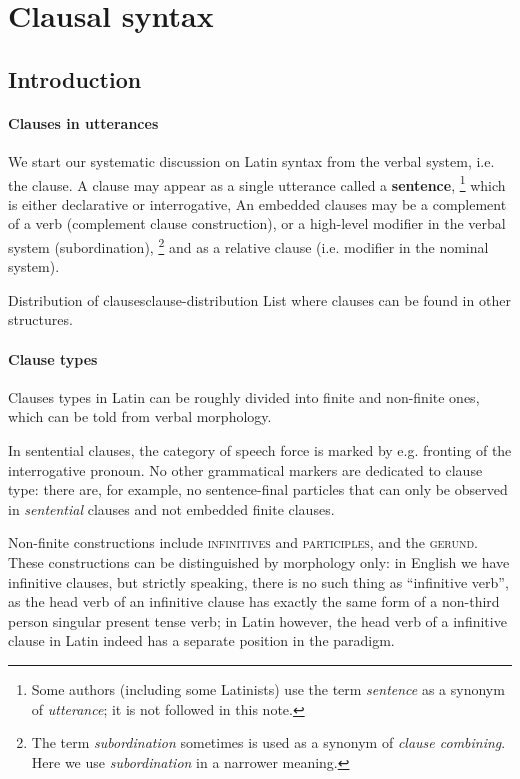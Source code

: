 \documentclass[a4paper, oneside, 12pt]{report}
\newcommand*{\concept}[1]{\textbf{#1}}
\newcommand*{\term}[1]{\emph{#1}}
\newcommand*{\category}[1]{\textsc{#1}}
\begin{document}
\section{Clausal syntax}\label{sec:grammatical.clause}

\subsection{Introduction}

\paragraph*{Clauses in utterances}
We start our systematic discussion on Latin syntax from the verbal system, i.e. the clause. 
A clause may appear as a single utterance called a \concept{sentence},%
\footnote{
    Some authors (including some Latinists) use the term \term{sentence}
    as a synonym of \term{utterance};
    it is not followed in this note.
}
which is either declarative or interrogative,
An embedded clauses may be a complement of a verb (complement clause construction),
or a high-level modifier in the verbal system (subordination),%
\footnote{
    The term \term{subordination} sometimes is used as a synonym of \term{clause combining}.
    Here we use \term{subordination} in a narrower meaning.
}
and as a relative clause 
(i.e. modifier in the nominal system).

\begin{todobox}{Distribution of clauses}{clause-distribution}
    List where clauses can be found in other structures.
\end{todobox}

\paragraph*{Clause types}
Clauses types in Latin can be roughly divided into finite and non-finite ones,
which can be told from verbal morphology.

In sentential clauses, 
the category of speech force is marked by e.g. fronting of the interrogative pronoun.
No other grammatical markers are dedicated to clause type:
there are, for example, no sentence-final particles 
that can only be observed in \emph{sentential} clauses
and not embedded finite clauses.

Non-finite constructions include \category{infinitives} and \category{participles}, and the \category{gerund}.
These constructions can be distinguished by morphology only:
in English we have infinitive clauses,
but strictly speaking, there is no such thing as ``infinitive verb'',
as the head verb of an infinitive clause 
has exactly the same form of a non-third person singular present tense verb;
in Latin however, the head verb of a infinitive clause in Latin 
indeed has a separate position in the paradigm.
\end{document}
